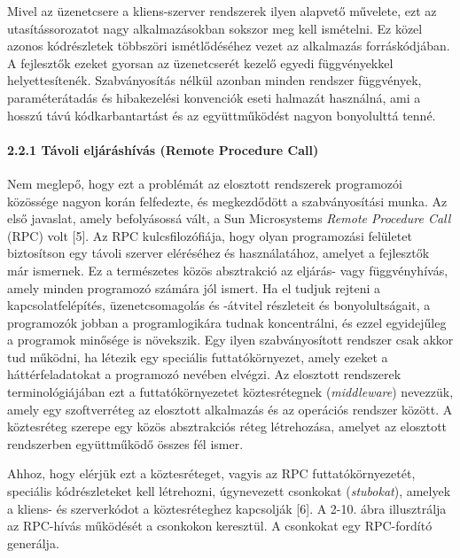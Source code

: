 \documentclass[
]{article}
\begin{document}
Mivel az üzenetcsere a kliens-szerver rendszerek ilyen alapvető
művelete, ezt az utasítássorozatot nagy alkalmazásokban sokszor meg kell
ismételni. Ez közel azonos kódrészletek többszöri ismétlődéséhez vezet
az alkalmazás forráskódjában. A fejlesztők ezeket gyorsan az
üzenetcserét kezelő egyedi függvényekkel helyettesítenék. Szabványosítás
nélkül azonban minden rendszer függvények, paraméterátadás és
hibakezelési konvenciók eseti halmazát használná, ami a hosszú távú
kódkarbantartást és az együttműködést nagyon bonyolulttá tenné.

\hypertarget{tuxe1voli-eljuxe1ruxe1shuxedvuxe1s-remote-procedure-call}{%
\paragraph{2.2.1 Távoli eljáráshívás (Remote Procedure
Call)}\label{tuxe1voli-eljuxe1ruxe1shuxedvuxe1s-remote-procedure-call}}

Nem meglepő, hogy ezt a problémát az elosztott rendszerek programozói
közössége nagyon korán felfedezte, és megkezdődött a szabványosítási
munka. Az első javaslat, amely befolyásossá vált, a Sun Microsystems
\emph{Remote Procedure Call} (RPC) volt {[}5{]}. Az RPC
kulcsfilozófiája, hogy olyan programozási felületet biztosítson egy
távoli szerver eléréséhez és használatához, amelyet a fejlesztők már
ismernek. Ez a természetes közös absztrakció az eljárás- vagy
függvényhívás, amely minden programozó számára jól ismert. Ha el tudjuk
rejteni a kapcsolatfelépítés, üzenetcsomagolás és -átvitel részleteit és
bonyolultságait, a programozók jobban a programlogikára tudnak
koncentrálni, és ezzel egyidejűleg a programok minősége is növekszik.
Egy ilyen szabványosított rendszer csak akkor tud működni, ha létezik
egy speciális futtatókörnyezet, amely ezeket a háttérfeladatokat a
programozó nevében elvégzi. Az elosztott rendszerek terminológiájában
ezt a futtatókörnyezetet köztesrétegnek (\emph{middleware}) nevezzük,
amely egy szoftverréteg az elosztott alkalmazás és az operációs rendszer
között. A köztesréteg szerepe egy közös absztrakciós réteg létrehozása,
amelyet az elosztott rendszerben együttműködő összes fél ismer.

Ahhoz, hogy elérjük ezt a köztesréteget, vagyis az RPC
futtatókörnyezetét, speciális kódrészleteket kell létrehozni,
úgynevezett csonkokat (\emph{stubokat}), amelyek a kliens- és
szerverkódot a köztesréteghez kapcsolják {[}6{]}. A 2-10. ábra
illusztrálja az RPC-hívás működését a csonkokon keresztül. A csonkokat
egy RPC-fordító generálja.
\end{document}
